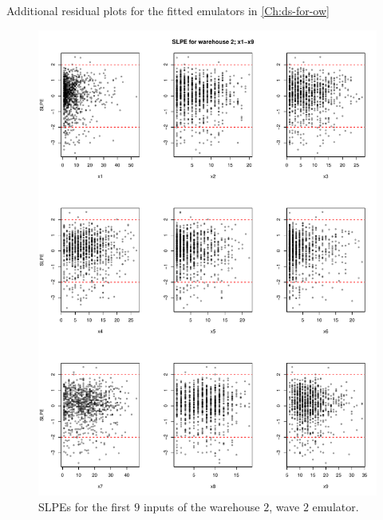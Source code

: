 \begin{chapter}{Additional residual plots  for the fitted emulators in \cref{Ch:ds-for-ow} \label{App:resid}}
\begin{figure}
  \includegraphics[width=\textwidth]{fig-app-ds/w2-w2-1.pdf}
  \caption{SLPEs for the first $9$ inputs of the warehouse $2$, wave $2$ emulator.}
\end{figure}


\end{chapter}

